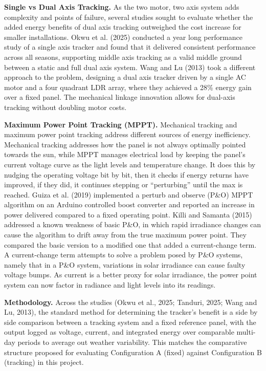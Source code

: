\documentclass[journal]{IEEEtran}
\begin{document}
\textbf{Single vs Dual Axis Tracking.} As the two motor, two axis system adds
complexity and points of failure, several studies sought to evaluate whether the added
energy benefits of dual axis tracking outweighed the cost increase for smaller
installations. Okwu et al. (2025) conducted a year long performance study of a single
axis tracker and found that it delivered consistent performance across all seasons,
supporting middle axis tracking as a valid middle ground between a static and full dual
axis system. Wang and Lu (2013) took a different approach to the problem, designing a
dual axis tracker driven by a single AC motor and a four quadrant LDR array, where they
achieved a 28\% energy gain over a fixed panel. The mechanical linkage innovation allows
for dual-axis tracking without doubling motor costs.

\textbf{Maximum Power Point Tracking (MPPT).} Mechanical tracking and maximum power
point tracking address different sources of energy inefficiency. Mechanical tracking
addresses how the panel is not always optimally pointed towards the sun, while MPPT
manages electrical load by keeping the panel's current voltage curve as the light
levels and temperature change. It does this by nudging the operating voltage bit by
bit, then it checks if energy returns have improved, if they did, it continues
stepping or ``perturbing'' until the max is reached. Guiza et al. (2019) implemented a
perturb and observe (P\&O) MPPT algorithm on an Arduino controlled boost converter and
reported an increase in power delivered compared to a fixed operating point. Killi and
Samanta (2015) addressed a known weakness of basic P\&O, in which rapid irradiance
changes can cause the algorithm to drift away from the true maximum power point. They
compared the basic version to a modified one that added a current-change term. A
current-change term attempts to solve a problem posed by P\&O systems, namely that in
a P\&O system, variations in solar irradiance can cause faulty voltage bumps. As
current is a better proxy for solar irradiance, the power point system can now factor in
radiance and light levels into its readings.

\textbf{Methodology.} Across the studies (Okwu et al., 2025; Tanduri, 2025; Wang and
Lu, 2013), the standard method for determining the tracker's benefit is a side by side
comparison between a tracking system and a fixed reference panel, with the output
logged as voltage, current, and integrated energy over comparable multi-day periods to
average out weather variability. This matches the comparative structure proposed for
evaluating Configuration A (fixed) against Configuration B (tracking) in this project.
\end{document}
